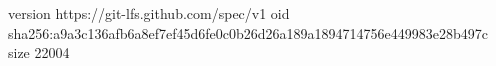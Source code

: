 version https://git-lfs.github.com/spec/v1
oid sha256:a9a3c136afb6a8ef7ef45d6fe0c0b26d26a189a1894714756e449983e28b497c
size 22004
